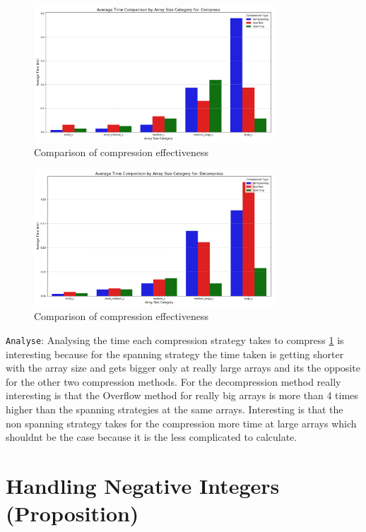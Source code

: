 \documentclass[11pt, a4paper]{article}
\begin{document}
	\begin{figure}[H]%
		\centering
		\includegraphics[width=0.8\textwidth]{Grafics/Compare/ComparingCompressTime.png}
		\caption{Comparison of compression effectiveness}
		\label{fig:33}
		\end{figure}
	\begin{figure}[H]%
		\centering
		\includegraphics[width=0.8\textwidth]{Grafics/Compare/ComparingDecompressTime.png}
		\caption{Comparison of compression effectiveness}
		\label{fig:34}
	\end{figure}
	\texttt{Analyse}: Analysing the time each compression strategy takes to compress \ref{fig:33} is interesting because for the spanning strategy the time taken is getting shorter with the array size and gets bigger only at really large arrays and its the opposite for the other two compression methods. For the decompression method really interesting is that the Overflow method for really big arrays is more than 4 times higher than the spanning strategies at the same arrays. Interesting is that the non spanning strategy takes for the compression more time at large arrays which shouldnt be the case because it is the less complicated to calculate.
	
	\section{Handling Negative Integers (Proposition)}
	
\end{document}
